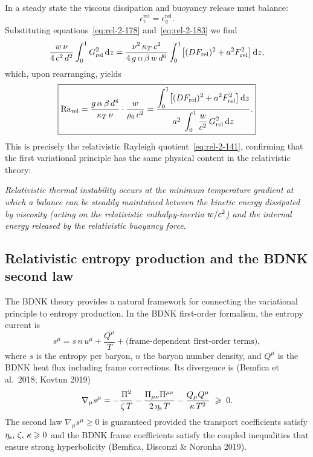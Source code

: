 In a steady state the viscous dissipation and buoyancy release must
balance:
\begin{equation}
\label{eq:rel-2-184}
\epsilon_v^{\mathrm{rel}} = \epsilon_g^{\mathrm{rel}}.
\end{equation}
Substituting equations~\eqref{eq:rel-2-178}
and~\eqref{eq:rel-2-183} we find
\begin{equation}
\label{eq:rel-2-185}
\frac{w\,\nu}{4\,c^2\,d^2}
\int_0^1 G_{\mathrm{rel}}^2\,\mathrm{d}z
=
\frac{\nu^2\,\kappa_T\,c^2}
{4\,g\,\alpha\,\beta\,w\,d^6}
\int_0^1 \bigl[(DF_{\mathrm{rel}})^2
  + a^2 F_{\mathrm{rel}}^2\bigr]\,\mathrm{d}z,
\end{equation}
which, upon rearranging, yields
\begin{equation}
\label{eq:rel-2-186}
\boxed{
\mathrm{Ra}_{\mathrm{rel}}
= \frac{g\,\alpha\,\beta\,d^4}{\kappa_T\,\nu}
  \cdot\frac{w}{\rho_0\,c^2}
= \frac{\displaystyle\int_0^1
  \bigl[(DF_{\mathrm{rel}})^2 + a^2 F_{\mathrm{rel}}^2\bigr]
  \,\mathrm{d}z}
{a^2\;\displaystyle\int_0^1
  \frac{w}{c^2}\,G_{\mathrm{rel}}^2\,\mathrm{d}z}.
}
\end{equation}
This is precisely the relativistic Rayleigh
quotient~\eqref{eq:rel-2-141}, confirming that the first variational
principle has the same physical content in the relativistic theory:

\emph{Relativistic thermal instability occurs at the minimum
temperature gradient at which a balance can be steadily maintained
between the kinetic energy dissipated by viscosity (acting on the
relativistic enthalpy-inertia $w/c^2$) and the internal energy
released by the relativistic buoyancy force.}

\subsection{Relativistic entropy production and the BDNK
second law}\label{sec:rel-14d}

The BDNK theory provides a natural framework for connecting
the variational principle to entropy production.  In the BDNK
first-order formalism, the entropy current is
\begin{equation}
\label{eq:rel-entropy-current}
s^\mu = s\,n\,u^\mu + \frac{Q^\mu}{T}
  + \text{(frame-dependent first-order terms)},
\end{equation}
where $s$ is the entropy per baryon, $n$ the baryon number density,
and $Q^\mu$ is the BDNK heat flux including frame corrections.
Its divergence is (Bemfica et al.\ 2018; Kovtun 2019)
\begin{equation}
\label{eq:rel-entropy-production}
\nabla_\mu s^\mu
= -\frac{\Pi^2}{\zeta\,T}
  - \frac{\Pi_{\mu\nu}\Pi^{\mu\nu}}{2\,\eta_{\mathrm{s}}\,T}
  - \frac{Q_\mu Q^\mu}{\kappa\,T^2}
  \;\geqslant\; 0.
\end{equation}
The second law $\nabla_\mu s^\mu \geqslant 0$ is guaranteed
provided the transport coefficients satisfy
$\eta_{\mathrm{s}},\,\zeta,\,\kappa \geqslant 0$ and the BDNK
frame coefficients satisfy the coupled inequalities that ensure
strong hyperbolicity (Bemfica, Disconzi \& Noronha 2019).

